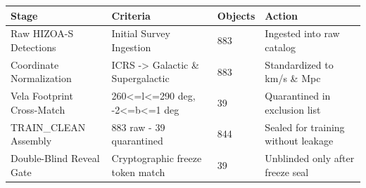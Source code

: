 \begin{tabular}{llll}
\hline
Stage & Criteria & Objects & Action \\
\hline
Raw HIZOA-S Detections & Initial Survey Ingestion & 883 & Ingested into raw catalog \\
Coordinate Normalization & ICRS -> Galactic \& Supergalactic & 883 & Standardized to km/s \& Mpc \\
Vela Footprint Cross-Match & 260<=l<=290 deg, -2<=b<=1 deg & 39 & Quarantined in exclusion list \\
TRAIN\_CLEAN Assembly & 883 raw - 39 quarantined & 844 & Sealed for training without leakage \\
Double-Blind Reveal Gate & Cryptographic freeze token match & 39 & Unblinded only after freeze seal \\
\hline
\end{tabular}
